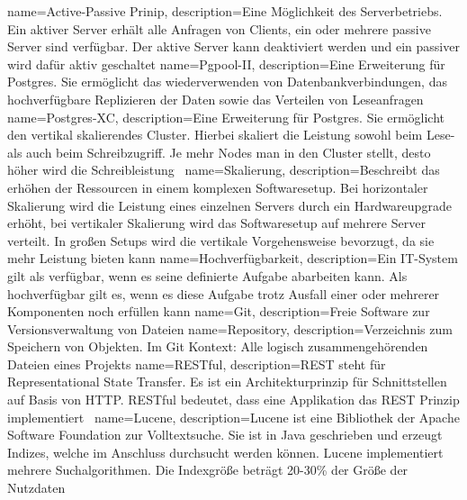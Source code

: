 {
  name=Active-Passive Prinip,
  description={Eine Möglichkeit des Serverbetriebs. Ein aktiver Server erhält
               alle Anfragen von Clients, ein oder mehrere passive Server sind
               verfügbar. Der aktive Server kann deaktiviert werden und ein
               passiver wird dafür aktiv geschaltet}
}
{
  name=Pgpool-II,
  description={Eine Erweiterung für Postgres. Sie ermöglicht das
               wiederverwenden von Datenbankverbindungen, das hochverfügbare
               Replizieren der Daten sowie das Verteilen von
               Leseanfragen~\cite{pgpool}}
}
{
  name=Postgres-XC,
  description={Eine Erweiterung für Postgres. Sie ermöglicht den vertikal
               skalierendes Cluster. Hierbei skaliert die Leistung sowohl beim
               Lese- als auch beim Schreibzugriff. Je mehr Nodes man in den
               Cluster stellt, desto höher wird die
               Schreibleistung~\cite{postgres-xc}}
}
{
  name=Skalierung,
  description={Beschreibt das erhöhen der Ressourcen in einem komplexen
               Softwaresetup. Bei horizontaler Skalierung wird die Leistung
               eines einzelnen Servers durch ein Hardwareupgrade erhöht,
               bei vertikaler Skalierung wird das Softwaresetup auf mehrere
               Server verteilt. In großen Setups wird die vertikale
               Vorgehensweise bevorzugt, da sie mehr Leistung bieten kann}
}
{
  name=Hochverfügbarkeit,
  description={Ein IT-System gilt als verfügbar, wenn es seine definierte
               Aufgabe abarbeiten kann. Als hochverfügbar gilt es, wenn es
               diese Aufgabe trotz Ausfall einer oder mehrerer Komponenten noch
               erfüllen kann}
}
{
  name=Git,
  description={Freie Software zur Versionsverwaltung von Dateien}
}
{
  name=Repository,
  description={Verzeichnis zum Speichern von Objekten. Im Git Kontext: Alle
               logisch zusammengehörenden Dateien eines Projekts}
}
{
  name=RESTful,
  description={REST steht für Representational State Transfer. Es ist ein
               Architekturprinzip für Schnittstellen auf Basis von HTTP.
               RESTful bedeutet, dass eine Applikation das REST Prinzip
               implementiert~\cite{fielding2000architectural}}
}
{
  name=Lucene,
  description={Lucene ist eine Bibliothek der Apache Software Foundation zur
               Volltextsuche. Sie ist in Java geschrieben und erzeugt Indizes,
               welche im Anschluss durchsucht werden können. Lucene
               implementiert mehrere Suchalgorithmen. Die Indexgröße beträgt
               20-30\% der Größe der Nutzdaten~\cite{lucene_features}}
}
